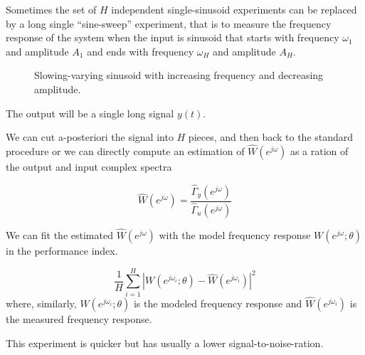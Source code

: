 
\begin{remark}
    Sometimes the set of $H$ independent single-sinusoid experiments can be replaced by a long single ``sine-sweep'' experiment, that is to measure the frequency response of the system when the input is sinusoid that starts with frequency $\omega_1$ and amplitude $A_1$ and ends with frequency $\omega_H$ and amplitude $A_H$. 

    \begin{figure}[H]
        \centering
        \caption*{Slowing-varying sinusoid with increasing frequency and decreasing amplitude.}
    \end{figure}

    The output will be a single long signal $y(t)$.
    
    We can cut a-posteriori the signal into $H$ pieces, and then back to the standard procedure
    or we can directly compute an estimation of $\hat{W}(e^{j\omega})$ as a ration of the output and input complex spectra %

    \[
        \hat{W}(e^{j\omega}) = \frac{\hat{\Gamma}_y(e^{j\omega})}{\hat{\Gamma}_u(e^{j\omega})}
    \]

    We can fit the estimated $\hat{W}(e^{j\omega})$ with the model frequency response $W(e^{j\omega}; \theta)$ in the performance index.
    
    \[
        \frac{1}{H} \sum_{i=1}^H \left| W(e^{j \omega_i}; \theta) - \hat{W}(e^{j \omega_i}) \right|^2
    \]
    where, similarly, $W(e^{j\omega_i}; \theta)$ is the modeled frequency response and $\hat{W}(e^{j \omega_i})$ is the measured frequency response.
    
    This experiment is quicker but has usually a lower signal-to-noise-ration.
\end{remark}

